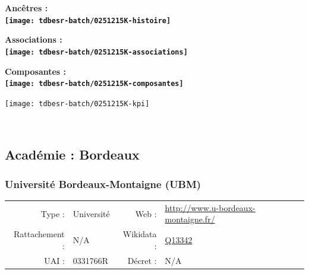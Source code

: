 \documentclass[12pt,french,]{article}
\begin{document}
\vspace{1cm}  
\begin{minipage}[b]{0.50\textwidth}\begin{center} \bf Ancêtres : \\  
\texttt{[image: tdbesr-batch/0251215K-histoire]} \end{center}\end{minipage}\begin{minipage}[b]{0.50\textwidth}\begin{center} \bf Associations : \\  
\texttt{[image: tdbesr-batch/0251215K-associations]} \end{center}\end{minipage}

\hrulefill

\begin{center} \bf Composantes : \\  
\texttt{[image: tdbesr-batch/0251215K-composantes]} \end{center}

\begin{center}\texttt{[image: tdbesr-batch/0251215K-kpi]} \end{center}\checkoddpage

\ifoddpage ~\newpage \fi   

\hypertarget{acaduxe9mie-bordeaux}{%
\subsection{Académie : Bordeaux}\label{acaduxe9mie-bordeaux}}

\hypertarget{universituxe9-bordeaux-montaigne-ubm}{%
\subsubsection{Université Bordeaux-Montaigne
(UBM)}\label{universituxe9-bordeaux-montaigne-ubm}}

\begin{tabular*}{\textwidth}{rp{5cm}rl}  
\hline  
Type : & Université & Web : &\href{http://www.u-bordeaux-montaigne.fr/}{http://www.u-bordeaux-montaigne.fr/} \\  
Rattachement : & N/A & Wikidata : & \href{https://www.wikidata.org/entity/Q13342}{Q13342} \\  
UAI : & 0331766R & Décret : & N/A \\  
\hline  
\end{tabular*}
\end{document}
